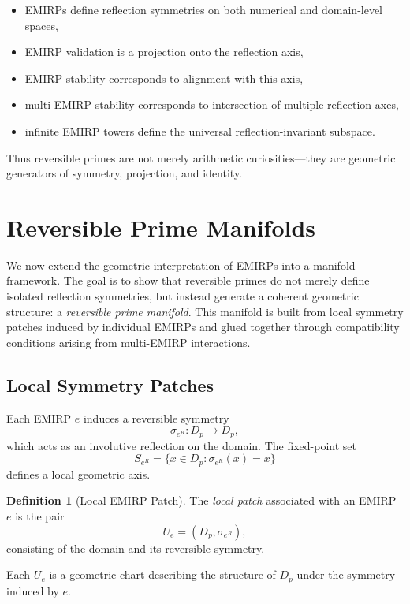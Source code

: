 \documentclass[11pt]{article}
\theoremstyle{definition}
\newtheorem{definition}{Definition}[section]
\theoremstyle{plain}
\theoremstyle{remark}
\begin{document}
\begin{itemize}
    \item EMIRPs define reflection symmetries on both numerical and
    domain-level spaces,
    \item EMIRP validation is a projection onto the reflection axis,
    \item EMIRP stability corresponds to alignment with this axis,
    \item multi-EMIRP stability corresponds to intersection of multiple
    reflection axes,
    \item infinite EMIRP towers define the universal reflection-invariant
    subspace.
\end{itemize}

Thus reversible primes are not merely arithmetic curiosities—they are
geometric generators of symmetry, projection, and identity.

\section{Reversible Prime Manifolds}

We now extend the geometric interpretation of EMIRPs into a manifold
framework. The goal is to show that reversible primes do not merely
define isolated reflection symmetries, but instead generate a coherent
geometric structure: a \emph{reversible prime manifold}. This manifold
is built from local symmetry patches induced by individual EMIRPs and
glued together through compatibility conditions arising from
multi-EMIRP interactions.

\subsection{Local Symmetry Patches}

Each EMIRP $e$ induces a reversible symmetry
\[
\sigma_{e^R} : D_p \to D_p,
\]
which acts as an involutive reflection on the domain. The fixed-point
set
\[
S_{e^R} = \{x \in D_p : \sigma_{e^R}(x) = x\}
\]
defines a local geometric axis.

\begin{definition}[Local EMIRP Patch]
The \emph{local patch} associated with an EMIRP $e$ is the pair
\[
U_e = (D_p, \sigma_{e^R}),
\]
consisting of the domain and its reversible symmetry.
\end{definition}

Each $U_e$ is a geometric chart describing the structure of $D_p$ under
the symmetry induced by $e$.
\end{document}
